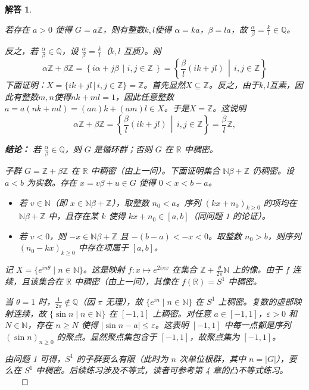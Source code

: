 \documentclass[12pt,UTF8,fontset=none]{ctexbook}
\theoremstyle{exercisestyle}
\theoremstyle{solutionstyle}
\newtheorem*{solution*}{解答}
\newenvironment{solution}
  {\begin{solution*}}
  {\hfill\ensuremath{\qed}\end{solution*}}
\begin{document}
\begin{solution}
\begin{subquestions}
    若存在 \(a > 0\) 使得 \(G = a\mathbb{Z}\)，则有整数$k, l$使得 \(\alpha = k a\)，\(\beta = l a\)，故 \(\frac{\alpha}{\beta} = \frac{k}{l} \in \mathbb{Q}\)。
    
    反之，若 \(\frac{\alpha}{\beta} \in \mathbb{Q}\)，设 \(\frac{\alpha}{\beta} = \frac{k}{l}\)（\(k,l\) 互质）。则
    \[
    \alpha \mathbb{Z} + \beta \mathbb{Z} = \left\{i\alpha + j\beta \, \middle| i, j \in \mathbb{Z}\, \right\} =  \left\{\frac{\beta}{l}(ik + jl) \, \middle| \, i, j \in \mathbb{Z} \right\}
    \]
    下面证明：$X = \{ik + jl \, | \, i, j \in \mathbb{Z} \} = \mathbb{Z}$。首先显然$X\subseteq \mathbb{Z}$。反之，由于$k, l$互素，因此有整数$m,n$使得$nk + ml = 1$，因此任意整数$a = a(nk + ml) = (an)k + (am)l \in X$。于是$X = \mathbb{Z}$。这说明
    $$ \alpha \mathbb{Z} + \beta \mathbb{Z} =  \left\{\frac{\beta}{l}(ik + jl) \, \middle| \, i, j \in \mathbb{Z} \right\} = \frac{\beta}{l}\mathbb{Z}, $$
    
    \textbf{结论：} 若 \(\frac{\alpha}{\beta} \in \mathbb{Q}\)，则 \(G\) 是循环群；否则 \(G\) 在 \(\mathbb{R}\) 中稠密。
    
    \item 子群 \(G = \mathbb{Z} + \beta \mathbb{Z}\) 在 \(\mathbb{R}\) 中稠密（由上一问）。下面证明集合 \(\mathbb{N}\beta + \mathbb{Z}\) 仍稠密。设 \(a < b\) 为实数。存在 \(x = v\beta + u \in G\) 使得 \(0 < x < b - a\)。
    
    \begin{itemize}
      \item 若 \(v \in \mathbb{N}\)（即 \(x \in \mathbb{N}\beta + \mathbb{Z}\)），取整数 \(n_0 < a\)。序列 \((k x + n_0)_{k \geqslant 0}\) 的项均在 \(\mathbb{N}\beta + \mathbb{Z}\) 中，且存在某 \(k\) 使得 \(k x + n_0 \in [a, b]\)（同问题 1 的论证）。
      \item 若 \(v < 0\)，则 \(-x \in \mathbb{N}\beta + \mathbb{Z}\) 且 \(-(b - a) < -x < 0\)。取整数 \(n_0 > b\)，则序列 \((n_0 - k x)_{k \geqslant 0}\) 中存在项属于 \([a, b]\)。
    \end{itemize}
    
    \item 记 \(X = \{ e^{i n \theta} \mid n \in \mathbb{N} \}\)。这是映射 \(f: x \mapsto e^{2i\pi x}\) 在集合 \(\mathbb{Z} + \frac{\theta}{2\pi} \mathbb{N}\) 上的像。由于 \(f\) 连续，且该集合在 \(\mathbb{R}\) 中稠密（由上一问），其像在 \(f(\mathbb{R}) = S^1\) 中稠密。
    
    当 \(\theta = 1\) 时，\(\frac{1}{2\pi} \notin \mathbb{Q}\)（因 \(\pi\) 无理），故 \(\{e^{i n} \mid n \in \mathbb{N}\}\) 在 \(S^1\) 上稠密。复数的虚部映射连续，故 \(\{\sin n \mid n \in \mathbb{N}\}\) 在 \([-1, 1]\) 上稠密。对任意 \(a \in [-1, 1]\)，\(\varepsilon > 0\) 和 \(N \in \mathbb{N}\)，存在 \(n \geqslant N\) 使得 \(|\sin n - a| \leqslant \varepsilon\)。这表明 \([-1, 1]\) 中每一点都是序列 \((\sin n)_{n \geqslant 0}\) 的聚点。显然聚点集包含于 \([-1, 1]\)，故聚点集为 \([-1, 1]\)。
  \end{subquestions}
  
  由问题 1 可得，\(S^1\) 的子群要么有限（此时为 \(n\) 次单位根群，其中 \(n = |G|\)），要么在 \(S^1\) 中稠密。后续练习涉及不等式，读者可参考第 4 章的凸不等式练习。
\end{solution}
\end{document}
